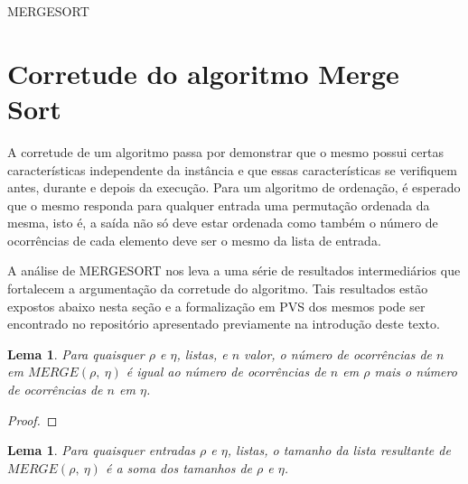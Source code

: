 \documentclass[12pt]{article}
\newtheorem{lemma}[theorem]{Lema}
\theoremstyle{definition}
\begin{document}
\begin{algorithm}[H]
        \caption{MERGESORT}
\end{algorithm}

\section{Corretude do algoritmo Merge Sort}
\label{correctness}

A corretude de um algoritmo passa por demonstrar que o mesmo possui certas características independente da instância e que essas características
se verifiquem antes, durante e depois da execução. Para um algoritmo de ordenação, é esperado que o mesmo responda para qualquer entrada uma permutação
ordenada da mesma, isto é, a saída não só deve estar ordenada como também o número de ocorrências de cada elemento deve ser o mesmo da lista de entrada.

A análise de MERGESORT nos leva a uma série de resultados intermediários que fortalecem a argumentação da corretude do algoritmo. Tais resultados estão expostos
abaixo nesta seção e a formalização em PVS dos mesmos pode ser encontrado no repositório apresentado previamente na introdução deste texto.

\begin{lemma}
\label{merge-preserves-occurrences}
        Para quaisquer $\rho$ e $\eta$, listas, e $n$ valor, o número de ocorrências de $n$ em $MERGE(\rho,\ \eta)$ é igual ao número de ocorrências
        de $n$ em $\rho$ mais o número de ocorrências de $n$ em $\eta$.
\end{lemma}

\begin{proof}

\end{proof}

\begin{lemma}
\label{merge-preserves-length}
        Para quaisquer entradas $\rho$ e $\eta$, listas, o tamanho da lista resultante de $MERGE(\rho,\ \eta)$ é a soma
        dos tamanhos de $\rho$ e $\eta$.
\end{lemma}
\end{document}
